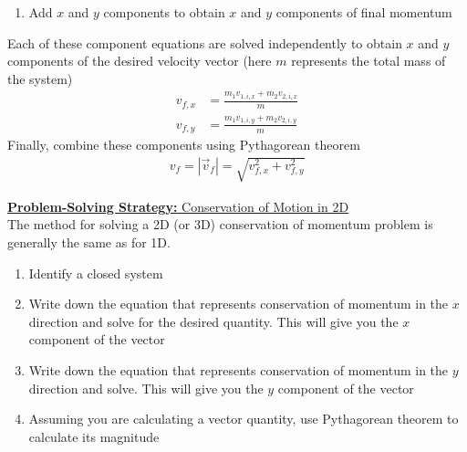 \documentclass[a4paper]{article}
\let\bf\textbf
\begin{document}
\begin{enumerate}
    \item Add $x$ and $y$ components to obtain $x$ and $y$ components of final momentum\\
\end{enumerate}
Each of these component equations are solved independently to obtain $x$ and $y$ components of the desired velocity vector (here $m$ represents the total mass of the system)
\begin{align*}
    v_{f,x} &= \frac{m_1 v_{1,i,x} + m_2 v_{2,i,x}}{m}\\
    v_{f,y} &= \frac{m_1 v_{1,i,y} + m_2 v_{2,i,y}}{m}
\end{align*}
Finally, combine these components using Pythagorean theorem
\begin{align*}
    v_f = |\vec{v}_f| = \sqrt{v^2_{f,x} + v^2_{f,y}}
\end{align*}

\begin{shaded}
    \underline{\bf{Problem-Solving Strategy:} Conservation of Motion in 2D}
    \vspace{2mm}\\
    The method for solving a 2D (or 3D) conservation of momentum problem is generally the same as for 1D.
    \begin{enumerate}
        \item Identify a closed system
        \item Write down the equation that represents conservation of momentum in the $x$ direction and solve for the desired quantity. This will give you the $x$ component of the vector
        \item Write down the equation that represents conservation of momentum in the $y$ direction and solve. This will give you the $y$ component of the vector
        \item Assuming you are calculating a vector quantity, use Pythagorean theorem to calculate its magnitude
    \end{enumerate}
\end{shaded}
\end{document}
